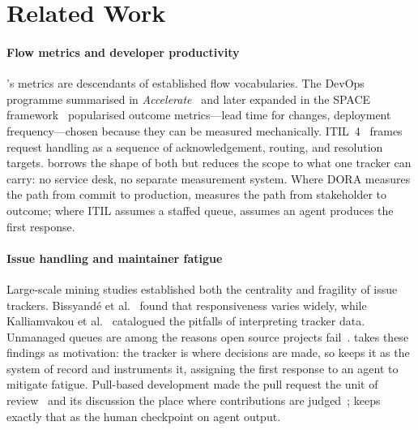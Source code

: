 \section{Related Work}
\paragraph{Flow metrics and developer productivity}
\ffrs{}'s metrics are descendants of established flow vocabularies. The DevOps programme summarised in \emph{Accelerate}~\cite{forsgren2018accelerate} and later expanded in the SPACE framework~\cite{forsgren2021space} popularised outcome metrics---lead time for changes, deployment frequency---chosen because they can be measured mechanically. ITIL~4~\cite{axelos2019itil} frames request handling as a sequence of acknowledgement, routing, and resolution targets. \ffrs{} borrows the shape of both but reduces the scope to what one tracker can carry: no service desk, no separate measurement system. Where DORA measures the path from commit to production, \ffrs{} measures the path from stakeholder to outcome; where ITIL assumes a staffed queue, \ffrs{} assumes an agent produces the first response.

\paragraph{Issue handling and maintainer fatigue}
Large-scale mining studies established both the centrality and fragility of issue trackers. Bissyand\'e et al.~\cite{bissyande2013gotissues} found that responsiveness varies widely, while Kalliamvakou et al.~\cite{kalliamvakou2014promises} catalogued the pitfalls of interpreting tracker data. Unmanaged queues are among the reasons open source projects fail~\cite{coelho2017why}. \ffrs{} takes these findings as motivation: the tracker is where decisions are made, so \ffrs{} keeps it as the system of record and instruments it, assigning the first response to an agent to mitigate fatigue. Pull-based development made the pull request the unit of review~\cite{gousios2014exploratory} and its discussion the place where contributions are judged~\cite{tsay2014letstalk}; \ffrs{} keeps exactly that as the human checkpoint on agent output.

